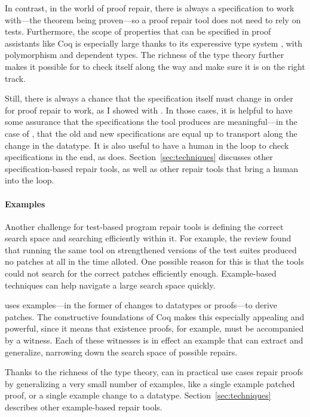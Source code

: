In contrast, in the world of proof repair, there is always a specification to work with---the theorem being proven---so
a proof repair tool does not need to rely on tests.
Furthermore, the scope of properties that can be specified in proof assistants like Coq is especially large thanks to its experessive type system ,
with polymorphism and dependent types.
The richness of the type theory further makes it possible for \sysnamelong to check itself along the way and make sure it is on the right track.

Still, there is always a chance that the specification itself must change in order for proof repair to work,
as I showed with \toolnamec.
In those cases, it is helpful to have some assurance that the specifications the tool produces are meaningful---in the case of
\toolnamec, that the old and new specifications are equal up to transport along the change in the datatype.
It is also useful to have a human in the loop to check specifications in the end,
as \toolnamec does.
Section~\ref{sec:techniques} discusses other specification-based repair tools,
as well as other repair tools that bring a human into the loop.

\paragraph{Examples}
Another challenge for test-based program repair tools is defining the correct search space and searching efficiently within it.
For example, the review found that running the same tool on strengthened versions of the test suites produced no patches at all in the time alloted.
One possible reason for this is that the tools could not search for the correct patches efficiently enough.
Example-based techniques can help navigate a large search space quickly.

\sysnamelong uses examples---in the former of changes to datatypes or proofs---to derive patches.
The constructive foundations of Coq makes this especially appealing and powerful,
since it means that existence proofs, for example, must be accompanied by a witness.
Each of these witnesses is in effect an example that \sysnamelong can extract and generalize,
narrowing down the search space of possible repairs.

Thanks to the richness of the type theory, \sysnamelong can in practical use cases repair proofs by generalizing a very small number of examples,
like a single example patched proof, or a single example change to a datatype.
Section~\ref{sec:techniques} describes other example-based repair tools.

